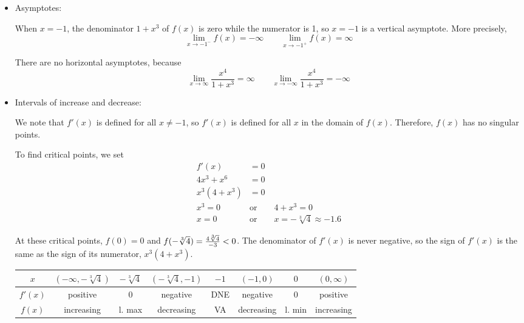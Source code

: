 \begin{solution}
\begin{itemize}
\item  Asymptotes:

When $x=-1$, the denominator $1+x^3$ of $f(x)$ is zero while the numerator is 1,  so $x=-1$ is a vertical asymptote. More precisely,
\[\lim_{x \to -1^-}f(x)=-\infty
\qquad
\lim_{x \to -1^+}f(x)=\infty\]

There are no horizontal asymptotes, because
\[\lim_{x \to \infty} \frac{x^4}{1+x^3}=\infty \qquad \lim_{x \to- \infty} \frac{x^4}{1+x^3}=-\infty\]

\item  Intervals of increase and decrease:

We note that $f'(x)$ is defined for all $x \neq -1$, so $f'(x)$ is defined for all $x$ in the domain of $f(x)$. Therefore, $f(x)$ has no singular points.

To find critical points, we set
\begin{align*}
f'(x)&=0\\
4x^3+x^6 &=0\\
x^3(4+x^3)&=0\\
x^3=0 \qquad &\mbox{or} \qquad 4+x^3=0\\
x=0 \qquad &\mbox{or} \qquad x=-\sqrt[3]{4}\approx-1.6
\end{align*}

At these critical points, $f(0)=0$ and
$f(-\root 3 \of 4)=\frac{4\root 3 \of 4}{-3}<0$.
The denominator of $f'(x)$ is never negative, so the sign of $f'(x)$ is the same as the sign of its numerator, $x^3(4+x^3)$.

\begin{center}
 \begin{tabular}{|c||c|c|c|c|c|c|c|}
\hline
$x$  & $(-\infty,-\sqrt[3]{4})$ &$-\sqrt[3]{4}$ & $(-\sqrt[3]{4},-1)$ & $-1$ &$(-1,0)$
&$0$&$(0,\infty)$\\
\hline
$f'(x)$  &  positive &0  &negative  &DNE &negative &0&positive \\
\hline
$f(x)$ & increasing & l. max&decreasing&VA &decreasing&l. min&increasing\\
\hline
 \end{tabular}
\end{center}


\end{itemize}
\end{solution}
